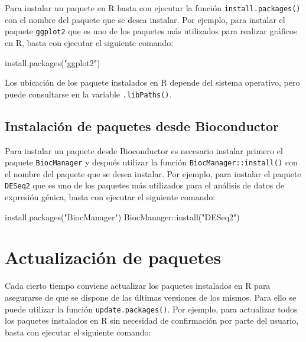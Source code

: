 \documentclass[
  spanish,
  a4paper,
]{scrreport}
\newenvironment{Shaded}{\begin{snugshade}}{\end{snugshade}}
\newcommand{\FunctionTok}[1]{\textcolor[rgb]{0.28,0.35,0.67}{#1}}
\newcommand{\NormalTok}[1]{\textcolor[rgb]{0.00,0.23,0.31}{#1}}
\newcommand{\SpecialCharTok}[1]{\textcolor[rgb]{0.37,0.37,0.37}{#1}}
\newcommand{\StringTok}[1]{\textcolor[rgb]{0.13,0.47,0.30}{#1}}
\theoremstyle{definition}
\theoremstyle{definition}
\theoremstyle{remark}
\begin{document}
Para instalar un paquete en R basta con ejecutar la función
\texttt{install.packages()} con el nombre del paquete que se desea
instalar. Por ejemplo, para instalar el paquete \texttt{ggplot2} que es
uno de los paquetes más utilizados para realizar gráficos en R, basta
con ejecutar el siguiente comando:

\begin{Shaded}
\begin{Highlighting}[]
\FunctionTok{install.packages}\NormalTok{(}\StringTok{"ggplot2"}\NormalTok{)}
\end{Highlighting}
\end{Shaded}

Los ubicación de los paquete instalados en R depende del sistema
operativo, pero puede consultarse en la variable \texttt{.libPaths()}.

\subsection{Instalación de paquetes desde
Bioconductor}\label{instalaciuxf3n-de-paquetes-desde-bioconductor}

Para instalar un paquete desde Bioconductor es necesario instalar
primero el paquete \texttt{BiocManager} y después utilizar la función
\texttt{BiocManager::install()} con el nombre del paquete que se desea
instalar. Por ejemplo, para instalar el paquete \texttt{DESeq2} que es
uno de los paquetes más utilizados para el análisis de datos de
expresión génica, basta con ejecutar el siguiente comando:

\begin{Shaded}
\begin{Highlighting}[]
\FunctionTok{install.packages}\NormalTok{(}\StringTok{"BiocManager"}\NormalTok{)}
\NormalTok{BiocManager}\SpecialCharTok{::}\FunctionTok{install}\NormalTok{(}\StringTok{"DESeq2"}\NormalTok{)}
\end{Highlighting}
\end{Shaded}

\section{Actualización de paquetes}\label{actualizaciuxf3n-de-paquetes}

Cada cierto tiempo conviene actualizar los paquetes instalados en R para
asegurarse de que se dispone de las últimas versiones de los mismos.
Para ello se puede utilizar la función \texttt{update.packages()}. Por
ejemplo, para actualizar todos los paquetes instalados en R sin
necesidad de confirmación por parte del usuario, basta con ejecutar el
siguiente comando:
\end{document}
